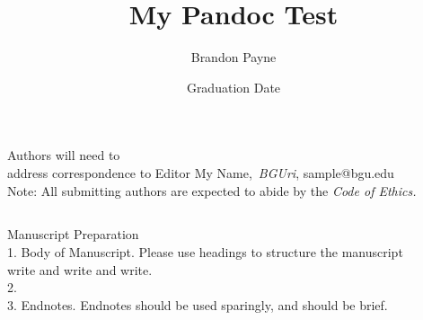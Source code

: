 \documentclass{ucetd}
\title{My Pandoc Test\\}
\author{Brandon Payne}
\date{Graduation Date}
\begin{document}
\maketitle





\abstract


\mainmatter



Authors will need to\\

address correspondence to Editor My Name,~\emph{BGUri}, sample@bgu.edu\\

Note: All submitting authors are expected to abide by the \emph{Code of
Ethics.}\\


\subsection{}\label{section}

Manuscript Preparation\\

1. Body of Manuscript. Please use headings to structure the manuscript\\

write and write and write.\\

2.\\

3. Endnotes. Endnotes should be used sparingly, and should be brief.
\end{document}
